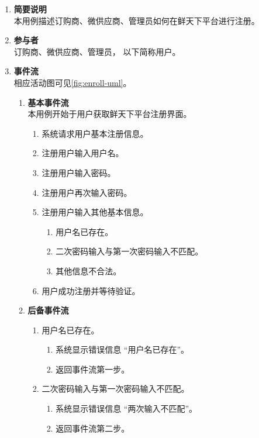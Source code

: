 \begin{enumerate}
    \item \textbf{简要说明}  \\ 本用例描述订购商、微供应商、管理员如何在鲜天下平台进行注册。
    \item \textbf{参与者} \\ 订购商、微供应商、管理员， 以下简称用户。
    \item \textbf{事件流} \\ 相应活动图可见\autoref{fig:enroll-uml}。
    \begin{enumerate} 
        \item \textbf{基本事件流} \\ 本用例开始于用户获取鲜天下平台注册界面。
        \begin{enumerate}
            \item 系统请求用户基本注册信息。
            \item 注册用户输入用户名。
            \item 注册用户输入密码。
            \item 注册用户再次输入密码。
            \item 注册用户输入其他基本信息。
            \begin{enumerate}
                \item 用户名已存在。
                \item 二次密码输入与第一次密码输入不匹配。
                \item 其他信息不合法。
            \end{enumerate}
            \item 用户成功注册并等待验证。
        \end{enumerate}
        \item \textbf{后备事件流}
        \begin{enumerate}
            \item 用户名已存在。
            \begin{enumerate}
                \item 系统显示错误信息 “用户名已存在”。
                \item 返回事件流第一步。
            \end{enumerate}
            \item 二次密码输入与第一次密码输入不匹配。
            \begin{enumerate}
                \item 系统显示错误信息 “两次输入不匹配”。
                \item 返回事件流第二步。

\end{enumerate}
\end{enumerate}
\end{enumerate}
\end{enumerate}
